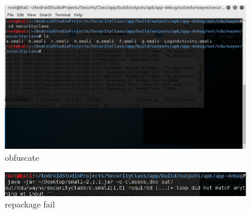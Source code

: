 \documentclass[onecolumn,oneside]{SUSTechHomework}
\begin{document}
    \begin{figure}[H]
      \centering
      \includegraphics[width=0.95\textwidth]{img/pic3.png}
      \caption{obfuscate}
    \end{figure}

    \begin{figure}[H]
      \centering
      \includegraphics[width=0.95\textwidth]{img/pic4.png}
      \caption{repackage fail}
    \end{figure}
  
\end{document}
